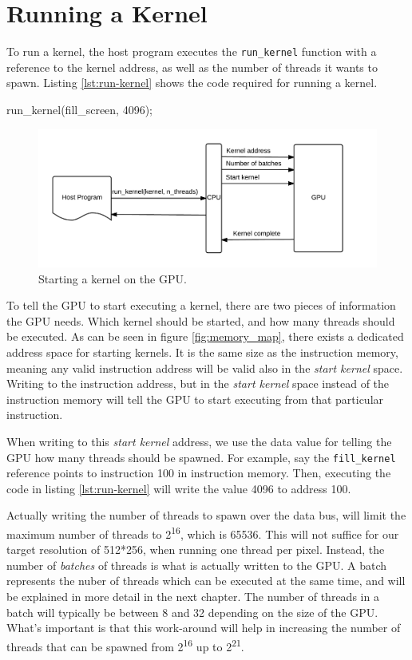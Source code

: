 \section{Running a Kernel}
To run a kernel, the host program executes the \verb/run_kernel/ function with a reference to the kernel address, as well as the number of threads it wants to spawn.
Listing \ref{lst:run-kernel} shows the code required for running a kernel.

\begin{c-code}[caption=Running a kernel, label=lst:run-kernel]
run_kernel(fill_screen, 4096);
\end{c-code}

\begin{figure}[H]
    \centering
    \includegraphics[width=\textwidth]{../cpu/diagrams/running_a_kernel.png}
    \caption{Starting a kernel on the GPU.}
    \label{fig:running_a_kernel}
\end{figure}

To tell the GPU to start executing a kernel,
there are two pieces of information the GPU needs.
Which kernel should be started, and how many threads should be executed.
As can be seen in figure \ref{fig:memory_map}, there exists a dedicated address space for starting kernels.
It is the same size as the instruction memory,
meaning any valid instruction address will be valid also in the \emph{start kernel} space.
Writing to the instruction address,
but in the \emph{start kernel} space instead of the instruction memory will tell the GPU to start executing from that particular instruction.

When writing to this \emph{start kernel} address, we use the data value for telling the GPU how many threads should be spawned.
For example, say the \verb/fill_kernel/ reference points to instruction 100 in instruction memory.
Then, executing the code in listing \ref{lst:run-kernel} will write the value 4096 to address 100.

Actually writing the number of threads to spawn over the data bus,
will limit the maximum number of threads to 2\textsuperscript{16}, which is 65536.
This will not suffice for our target resolution of 512*256,
when running one thread per pixel.
Instead, the number of \emph{batches} of threads is what is actually written to the GPU.
A batch represents the nuber of threads which can be executed at the same time,
and will be explained in more detail in the next chapter.
The number of threads in a batch will typically be between 8 and 32 depending on the size of the GPU.
What's important is that this work-around will help in increasing the number of threads that can be spawned from 2\textsuperscript{16} up to 2\textsuperscript{21}.

